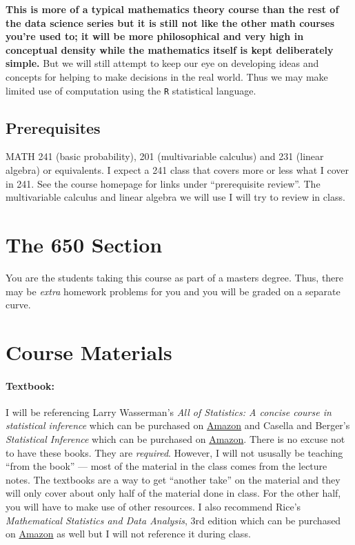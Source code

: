 \documentclass[12pt]{article}
\newcommand{\qu}[1]{``#1''}
\begin{document}
\textbf{This is more of a typical mathematics theory course than the rest of the data science series but it is still not like the other math courses you're used to; it will be more philosophical and very high in conceptual density while the mathematics itself is kept deliberately simple.} But we will still attempt to keep our eye on developing ideas and concepts for helping to make decisions in the real world. Thus we may make limited use of computation using the \texttt{R} statistical language.

\subsection*{Prerequisites}

MATH 241 (basic probability), 201 (multivariable calculus) and 231 (linear algebra) or equivalents. I expect a 241 class that covers more or less what I cover in 241. See the course homepage for links under \qu{prerequisite review}. The multivariable calculus and linear algebra we will use I will try to review in class.


\section*{The 650 Section}

You are the students taking this course as part of a masters degree. Thus, there may be \textit{extra} homework problems for you and you will be graded on a separate curve.

\section*{Course Materials}

\paragraph{Textbook:} I will be referencing Larry Wasserman's \emph{All of Statistics: A concise course in statistical inference} which can be purchased on \href{https://www.amazon.com/dp/0387402721}{Amazon} and Casella and Berger's \emph{Statistical Inference} which can be purchased on \href{https://www.amazon.com/dp/8131503941}{Amazon}. There is no excuse not to have these books. They are \textit{required}. However, I will not ususally be teaching \qu{from the book} --- most of the material in the class comes from the lecture notes. The textbooks are a way to get ``another take'' on the material and they will only cover about only half of the material done in class. For the other half, you will have to make use of other resources. I also recommend Rice's \emph{Mathematical Statistics and Data Analysis}, 3rd edition which can be purchased on \href{https://www.amazon.com/dp/0534399428}{Amazon} as well but I will not reference it during class.
\end{document}
